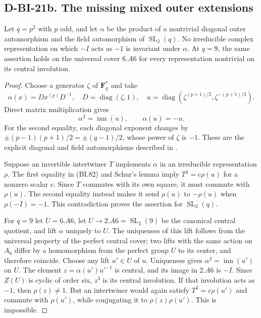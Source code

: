 \subsection*{D-BI-21b. The missing mixed outer extensions}

\begin{lemma}
\label{D-BI-21b}
Let $q=p^2$ with $p$ odd, and let $\alpha$ be the product of a
nontrivial diagonal outer automorphism and the field automorphism
of $\operatorname{SL}_2(q)$.  No irreducible complex representation
on which $-I$ acts as $-1$ is invariant under $\alpha$.
At $q=9$, the same assertion holds on the universal cover $6.A6$
for every representation nontrivial on its central involution.
\end{lemma}

\begin{proof}
Choose a generator $\zeta$ of $\mathbf F_q^*$ and take
\[
 \alpha(x)=D x^{(p)}D^{-1},\quad
 D=\operatorname{diag}(\zeta,1),\quad
 u=\operatorname{diag}(\zeta^{(p+1)/2},\zeta^{-(p+1)/2}).
\]
Direct matrix multiplication gives
\[
                     \alpha^2=\operatorname{inn}(u),
                     \qquad \alpha(u)=-u.                  \tag{BI.82}
\]
For the second equality, each diagonal exponent changes by
$\pm(p-1)(p+1)/2=\pm(q-1)/2$, whose power of $\zeta$ is $-1$.
These are the explicit diagonal and field automorphisms described
in \cite[\S3, pp.~5--7]{BI:WhiteSL2}.

Suppose an invertible intertwiner $T$ implements $\alpha$ in an
irreducible representation $\rho$.  The first equality in
(BI.82) and Schur's lemma imply $T^2=c\rho(u)$ for a nonzero
scalar $c$.  Since $T$ commutes with its own square, it must
commute with $\rho(u)$.  The second equality instead makes it
send $\rho(u)$ to $-\rho(u)$ when $\rho(-I)=-1$.
This contradiction proves the assertion for $\operatorname{SL}_2(q)$.

For $q=9$ let $U=6.A6$, let $U\to2.A6=\operatorname{SL}_2(9)$
be the canonical central quotient, and lift $\alpha$ uniquely
to $U$.  The uniqueness of this lift follows from the universal
property of the perfect central cover; two lifts with the same
action on $A_6$ differ by a homomorphism from the perfect group
$U$ to its center, and therefore coincide.  Choose any lift
$u'\in U$ of $u$.  Uniqueness gives
$\alpha^2=\operatorname{inn}(u')$ on $U$.
The element $z=\alpha(u')u'^{-1}$ is central, and its image in
$2.A6$ is $-I$.  Since $Z(U)$ is cyclic of order six, $z^3$ is
its central involution.  If that involution acts as $-1$, then
$\rho(z)\ne1$.  But an intertwiner would again satisfy
$T^2=c\rho(u')$ and commute with $\rho(u')$, while conjugating
it to $\rho(z)\rho(u')$.  This is impossible.
\end{proof}

